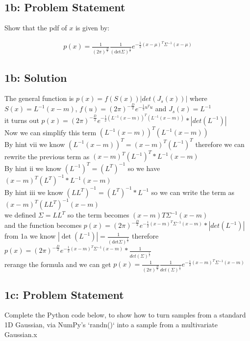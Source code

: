 \documentclass[10pt]{article}
\newcommand{\officialdirections}[1]{{\color{purple} #1}}
\begin{document}
\officialdirections{
\subsection*{1b: Problem Statement}
Show that the pdf of $x$ is given by:

\begin{align}
p(x) = \frac{1}{(2\pi)^{\frac{D}{2}}}
\frac{1}{(\text{det} \Sigma)^{\frac{1}{2}}}
e^{-\frac{1}{2} (x-\mu)^T \Sigma^{-1} (x-\mu)}
\end{align}
}

\subsection{1b: Solution}
The general function is $p(x) = f(S(x))|det(J_s(x))|$ where $S(x) = L^{-1}(x-m)$, $f(u) = (2\pi)^{-\frac{D}{2}}e^{-\frac{1}{2}u^Tu}$ and $J_s(x) = L^{-1}$
\\
it turns out $p(x) = (2\pi)^{-\frac{D}{2}}e^{-\frac{1}{2}(L^{-1}(x-m))^T(L^{-1}(x-m))}* |det(L^{-1})|$
\\
Now we can simplify this term $(L^{-1}(x-m))^T(L^{-1}(x-m))$
\\
By hint vii we know $(L^{-1}(x-m))^T = (x-m)^T(L^{-1})^T$ therefore we can rewrite the previous term as $(x-m)^T(L^{-1})^{T}*L^{-1}(x-m)$
\\
By hint ii we know $(L^{-1})^T = (L^T)^{-1}$ so we have $(x-m)^T(L^T)^{-1}*L^{-1}(x-m)$
\\
By hint iii we know $(LL^T)^{-1} = (L^T)^{-1} * L^{-1}$ so we can write the term as $(x-m)^T(LL^T)^{-1}(x-m)$
\\
we defined $\Sigma = LL^T$ so the term becomes $(x-m)T\Sigma^{-1}(x-m)$
\\
and the function becomes $p(x) = (2\pi)^{-\frac{D}{2}}e^{-\frac{1}{2}(x-m)^T\Sigma^{-1}(x-m)}*|det(L^{-1})|$
\\
from 1a we know $| \det (L^{-1}) | = \frac{1}{(\text{det} \Sigma)^{\frac{1}{2}}}$ therefore $p(x) = (2\pi)^{-\frac{D}{2}}e^{-\frac{1}{2}(x-m)^T\Sigma^{-1}(x-m)}*\frac{1}{det(\Sigma)^{\frac{1}{2}}}$
\\
rerange the formula and we can get $p(x) = \frac{1}{(2\pi)^{\frac{D}{2}}}\frac{1}{det(\Sigma)^{\frac{1}{2}}}e^{-\frac{1}{2}(x-m)^T\Sigma^{-1}(x-m)}$

\newpage 
\officialdirections{
\subsection*{1c: Problem Statement}
Complete the Python code below, to show how to turn samples from a standard 1D Gaussian, via NumPy's `randn()` into a sample from a multivariate Gaussian.x}
\end{document}
